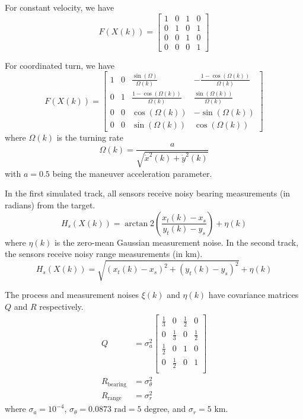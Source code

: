\documentclass[10pt,letterpaper,final]{article}
\begin{document}
For constant velocity, we have
\begin{equation}
F(X(k)) = 
\left[
\begin{array}{cccc}
1 & 0 & 1 & 0 \\
0 & 1 & 0 & 1 \\
0 & 0 & 1 & 0 \\
0 & 0 & 0 & 1
\end{array}
\right]
\end{equation}

For coordinated turn, we have 
\begin{equation}
F(X(k)) = 
\left[
\begin{array}{cccc}
1 & 0 & \frac{\sin(\Omega)}{\Omega (k)} & -\frac{1-\cos(\Omega (k))}{\Omega (k)} \\
0 & 1 & \frac{1-\cos(\Omega (k))}{\Omega (k)} & \frac{\sin(\Omega (k))}{\Omega (k)} \\
0 & 0 & \cos(\Omega (k)) & -\sin(\Omega (k)) \\
0 & 0 & \sin(\Omega (k)) & \cos(\Omega (k)) 
\end{array}
\right]
\end{equation}
where $\Omega (k)$ is the turning rate
\begin{equation}
\Omega (k) = \frac{a}{\sqrt{\dot{x}^2(k)+\dot{y}^2(k)}}
\end{equation}
with $a=0.5$ being the maneuver acceleration parameter. 

In the first simulated track, all sensors receive noisy bearing measurements (in radians) from the target.
\begin{equation}
H_s(X(k))= \arctan2 \left( \frac{x_t(k)-x_s}{y_t(k)-y_s} \right) + \eta(k)
\end{equation}
where $\eta(k)$ is the zero-mean Gaussian measurement noise. In the second track, the sensors receive noisy range measurements (in km).
\begin{equation}
H_s(X(k)) = \sqrt{(x_t(k)-x_s)^2+(y_t(k)-y_s)^2} + \eta(k)
\end{equation}

The process and measurement noises $\xi(k)$ and $\eta(k)$ have covariance matrices $Q$ and $R$ respectively.
\begin{align}
Q &= \sigma_a^2
\left[
\begin{array}{cccc}
\frac{1}{3} & 0 & \frac{1}{2} & 0 \\
0 & \frac{1}{3} & 0 & \frac{1}{2} \\
\frac{1}{2} & 0 & 1 & 0 \\
0 & \frac{1}{2} & 0 & 1 \\
\end{array}
\right]\\
R_{\text{bearing}} &= \sigma_{\theta}^2 \\
R_{\text{range}} &= \sigma_{r}^2
\end{align}
where $\sigma_a=10^{-4}$, $\sigma_{\theta}=0.0873\text{ rad} = 5 \text{ degree}$, and $\sigma_{r}= 5 \text{ km}$.
\end{document}
